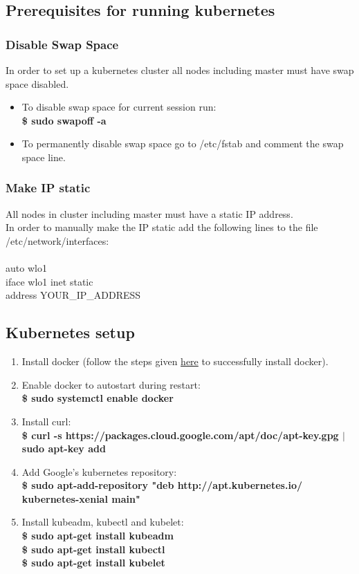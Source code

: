 \documentclass[12pt]{article}
\begin{document}
\subsection{Prerequisites for running kubernetes}
\subsubsection{Disable Swap Space}
In order to set up a kubernetes cluster all nodes including master must have swap space disabled.
\begin{itemize}
	\item To disable swap space for current session run: \\
		  \textbf{\$ sudo swapoff -a}
	\item To permanently disable swap space go to /etc/fstab and comment the swap space line.
\end{itemize}
\subsubsection{Make IP static}
All nodes in cluster including master must have a static IP address.\\
In order to manually make the IP static add the following lines to the file /etc/network/interfaces:\\\\
auto wlo1\\
iface wlo1 inet static\\
address  YOUR\_IP\_ADDRESS
\subsection{Kubernetes setup}
\begin{enumerate}
	\item Install docker (follow the steps given \hyperref[sec:dockerinstall]{here} to successfully install docker).
	\item Enable docker to autostart during restart:\\
	\textbf{\$ sudo systemctl enable docker}
	\item Install curl:\\
	\textbf{\$ curl -s https://packages.cloud.google.com/apt/doc/apt-key.gpg $\vert$ sudo apt-key add}
	\item Add Google’s kubernetes repository:\\
	\textbf{\$ sudo apt-add-repository "deb http://apt.kubernetes.io/ kubernetes-xenial main"}
	\item Install kubeadm, kubectl and kubelet:\\
	\textbf{\$ sudo apt-get install kubeadm}\\
	\textbf{\$ sudo apt-get install kubectl}\\
	\textbf{\$ sudo apt-get install kubelet}
\end{enumerate}
\end{document}
